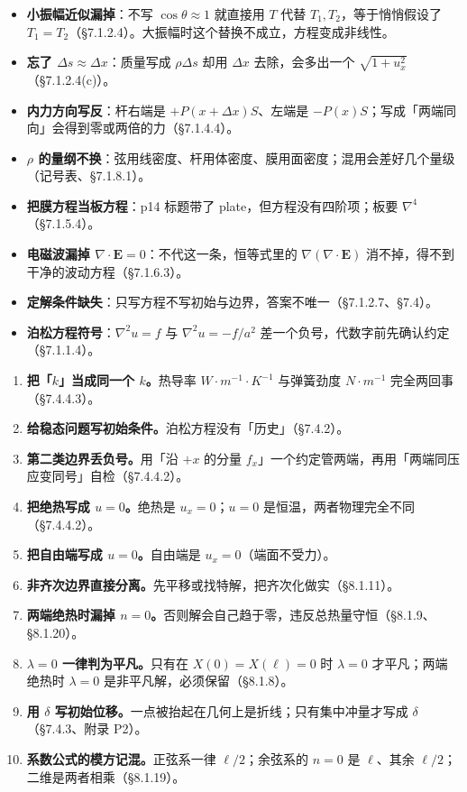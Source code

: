 
\begin{itemize}
\item \textbf{小振幅近似漏掉}：不写 $\cos\theta\approx1$ 就直接用 $T$ 代替 $T_1,T_2$，等于悄悄假设了 $T_1=T_2$（§7.1.2.4）。大振幅时这个替换不成立，方程变成非线性。
\item \textbf{忘了 $\Delta s\approx\Delta x$}：质量写成 $\rho\Delta s$ 却用 $\Delta x$ 去除，会多出一个 $\sqrt{1+u_x^2}$（§7.1.2.4(c)）。
\item \textbf{内力方向写反}：杆右端是 $+P(x+\Delta x)S$、左端是 $-P(x)S$；写成「两端同向」会得到零或两倍的力（§7.1.4.4）。
\item \textbf{$\rho$ 的量纲不换}：弦用线密度、杆用体密度、膜用面密度；混用会差好几个量级（记号表、§7.1.8.1）。
\item \textbf{把膜方程当板方程}：p14 标题带了 plate，但方程没有四阶项；板要 $\nabla^4$（§7.1.5.4）。
\item \textbf{电磁波漏掉 $\nabla\cdot\mathbf E=0$}：不代这一条，恒等式里的 $\nabla(\nabla\cdot\mathbf E)$ 消不掉，得不到干净的波动方程（§7.1.6.3）。
\item \textbf{定解条件缺失}：只写方程不写初始与边界，答案不唯一（§7.1.2.7、§7.4）。
\item \textbf{泊松方程符号}：$\nabla^2u=f$ 与 $\nabla^2u=-f/a^2$ 差一个负号，代数字前先确认约定（§7.1.1.4）。
\end{itemize}


\begin{enumerate}[label=\textbf{\arabic*.}]
  \item \textbf{把「$k$」当成同一个 $k$。}热导率 $\unit{W\cdot m^{-1}\cdot K^{-1}}$ 与弹簧劲度 $\unit{N\cdot m^{-1}}$ 完全两回事（\S7.4.4.3）。
  \item \textbf{给稳态问题写初始条件。}泊松方程没有「历史」（\S7.4.2）。
  \item \textbf{第二类边界丢负号。}用「沿 $+x$ 的分量 $f_x$」一个约定管两端，再用「两端同压应变同号」自检（\S7.4.4.2）。
  \item \textbf{把绝热写成 $u=0$。}绝热是 $u_x=0$；$u=0$ 是恒温，两者物理完全不同（\S7.4.4.2）。
  \item \textbf{把自由端写成 $u=0$。}自由端是 $u_x=0$（端面不受力）。
  \item \textbf{非齐次边界直接分离。}先平移或找特解，把齐次化做实（\S8.1.11）。
  \item \textbf{两端绝热时漏掉 $n=0$。}否则解会自己趋于零，违反总热量守恒（\S8.1.9、\S8.1.20）。
  \item \textbf{$\lambda=0$ 一律判为平凡。}只有在 $X(0)=X(\ell)=0$ 时 $\lambda=0$ 才平凡；两端绝热时 $\lambda=0$ 是非平凡解，必须保留（\S8.1.8）。
  \item \textbf{用 $\delta$ 写初始位移。}一点被抬起在几何上是折线；只有集中冲量才写成 $\delta$（\S7.4.3、附录 P2）。
  \item \textbf{系数公式的模方记混。}正弦系一律 $\ell/2$；余弦系的 $n=0$ 是 $\ell$、其余 $\ell/2$；二维是两者相乘（\S8.1.19）。
\end{enumerate}

